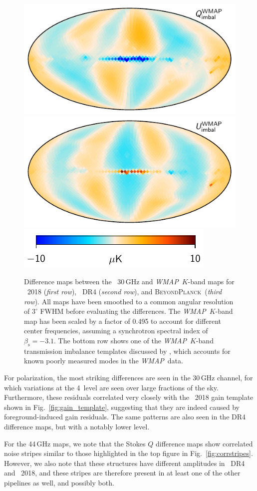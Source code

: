 \documentclass[twocolumn]{aa}
\def\WMAP{\textit{WMAP}}
\newcommand{\BP}{\textsc{BeyondPlanck}}
\begin{document}
\begin{figure}[p]
    \includegraphics[width=0.495\linewidth]{figs/wmap_loss_imbalance_template1_K1_v5_iqu_Q.pdf}
    \includegraphics[width=0.495\linewidth]{figs/wmap_loss_imbalance_template1_K1_v5_iqu_U.pdf}\\    
    \includegraphics[width=0.40\linewidth]{figs/colourbar_10uK.pdf}
    \caption{Difference maps between the \Planck\ 30\,GHz and \WMAP\ $K$-band maps for \Planck\ 2018 (\emph{first row}), \Planck\ DR4 (\emph{second row}), and \BP\ (\emph{third row}). All maps have been smoothed to a common angular resolution of $3^{\circ}$ FWHM before evaluating the differences. The \WMAP\ $K$-band map has been scaled by a factor of 0.495 to account for different center frequencies, assuming a synchrotron spectral index of $\beta_{\mathrm{s}}=-3.1$. The bottom row shows one of the \WMAP\ $K$-band transmission imbalance templates discussed by \citet{jarosik2007}, which accounts for known poorly measured modes in the \WMAP\ data. }
    \label{fig:diff_30_k}
\end{figure}


For polarization, the most striking differences are seen in the
30\,GHz channel, for which variations at the 4\muK\ level are seen
over large fractions of the sky. Furthermore, these residuals
correlated very closely with the \Planck\ 2018 gain template shown in
Fig.~\ref{fig:gain_template}, suggesting that they are indeed caused
by foreground-induced gain residuals. The same patterns are also seen
in the DR4 difference maps, but with a notably lower level.

For the 44\,GHz maps, we note that the Stokes $Q$ difference
maps show correlated noise stripes similar to those highlighted in
the top figure in Fig.~\ref{fig:corrstripes}. However, we also note that these
structures have different amplitudes in \Planck\ DR4 and \Planck\ 2018,
and these stripes are therefore present in at least one of the other
pipelines as well, and possibly both. 
\end{document}
